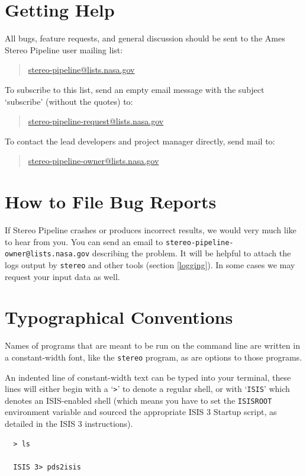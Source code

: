 \pagebreak
\section{Getting Help}\label{get-help}

All bugs, feature requests, and general discussion should be sent to
the Ames Stereo Pipeline user mailing list:
\begin{quote}
\indent \href{mailto:stereo-pipeline@lists.nasa.gov}{stereo-pipeline@lists.nasa.gov}
\end{quote}
To subscribe to this list, send an empty email message with the
subject `subscribe' (without the quotes) to:
\begin{quote}
\indent \href{mailto:stereo-pipeline-request@lists.nasa.gov}{stereo-pipeline-request@lists.nasa.gov}
\end{quote}
To contact the lead developers and project manager directly, send mail
to:
\begin{quote}
\indent \href{mailto:stereo-pipeline-owner@lists.nasa.gov}{stereo-pipeline-owner@lists.nasa.gov}
\end{quote}

\section{How to File Bug Reports} 

If Stereo Pipeline crashes or produces incorrect results, we would very
much like to hear from you. You can send an email to
\texttt{stereo-pipeline-owner@lists.nasa.gov} describing the problem. It
will be helpful to attach the logs output by \texttt{stereo} and other
tools (section \ref{logging}). In some cases we may request your input
data as well.

\section{Typographical Conventions}

Names of programs that are meant to be run on the command line are
written in a constant-width font, like the \texttt{stereo} program,
as are options to those programs.

An indented line of constant-width text can be typed into your
terminal, these lines will either begin with a `\texttt{>}' to
denote a regular shell, or with `\texttt{ISIS}' which denotes an
\ac{ISIS}-enabled shell (which means you have to set the \texttt{ISISROOT}
environment variable and sourced the appropriate \ac{ISIS} 3 Startup
script, as detailed in the \ac{ISIS} 3 instructions).
\begin{verbatim}
  > ls

  ISIS 3> pds2isis
\end{verbatim}

